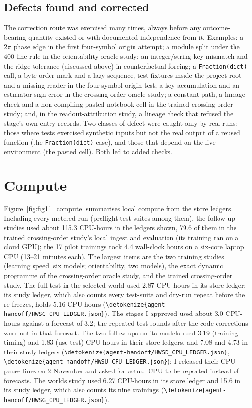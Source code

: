 \documentclass[11pt,a4paper]{article}
\DeclareRobustCommand{\_}{\ifmmode\origunderscore\else\textunderscore\allowbreak\fi}
\DeclareRobustCommand{\fpath}[1]{\begingroup\small\expandafter\nolinkurl\expandafter{\detokenize{#1}}\endgroup}
\begin{document}
\subsection{Defects found and corrected}
The correction route was exercised many times, always before any outcome-bearing quantity existed
or with documented independence from it. Examples: a $2\pi$ phase edge in the first four-symbol
origin attempt; a module split under the 400-line rule in the orientability oracle study; an
integer/string key mismatch and the ridge tolerance (discussed above) in counterfactual forcing;
a \texttt{Fraction(dict)} call, a byte-order mark and a lazy sequence, test fixtures inside the
project root and a missing reader in the four-symbol origin test; a key accumulation and an
estimator sign error in the crossing-order oracle study; a constant path, a lineage check and a
non-compiling pasted notebook cell in the trained crossing-order study; and, in the
readout-attribution study, a lineage check that refused the stage's own entry records. Two
classes of defect were caught only by real runs: those where tests exercised synthetic inputs
but not the real output of a reused function (the \texttt{Fraction(dict)} case), and those that
depend on the live environment (the pasted cell). Both led to added checks.

\section{Compute}\label{sec:compute}
Figure~\ref{fig:fig11_compute} summarises local compute from the store ledgers. Including every
metered run (preflight test suites among them), the follow-up studies used about 115.3 CPU-hours
in the ledgers shown, 79.6 of them in the trained crossing-order study's local ingest and
evaluation (its training ran on a cloud GPU); the 17 pilot trainings took 4.4 wall-clock hours on a six-core laptop CPU
(13--21 minutes each). The largest items are the two training studies (learning speed, six models;
orientability, two models), the exact dynamic programme of the crossing-order oracle study, and
the trained crossing-order study. The full test in the selected world used 2.87 CPU-hours in its
store ledger; its study ledger, which also counts every test-suite and dry-run repeat before the
re-freezes, holds 5.16 CPU-hours (\fpath{agent-handoff/HWSC_CPU_LEDGER.json}). The stages I
approved used about 3.0 CPU-hours against a forecast of 3.2; the repeated test rounds after the
code corrections were not in that forecast. The two follow-ups on its models used 3.19 (training
timing) and 1.83 (use test) CPU-hours in their store ledgers, and 7.08 and 4.73 in their study
ledgers (\fpath{agent-handoff/HWSD_CPU_LEDGER.json}, \fpath{agent-handoff/HWSU_CPU_LEDGER.json}); I
released their CPU pause lines on 2 November and asked for actual CPU to be reported instead of
forecasts. The worlds study used 6.27 CPU-hours in its store ledger and 15.6 in its study ledger,
which also counts its nine trainings (\fpath{agent-handoff/HWSG_CPU_LEDGER.json}).
\end{document}
